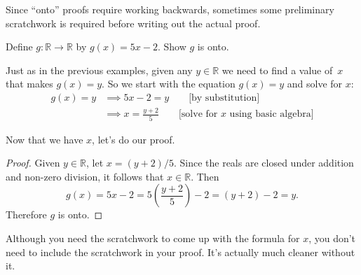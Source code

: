% 
%

Since ``onto'' proofs require working backwards, sometimes some preliminary scratchwork is required before writing out the actual proof.

\begin{example}{}
Define $g \colon \mathbb{R} \to \mathbb{R}$ by $g(x) = 5x - 2$. Show $g$ is onto.


\begin{scratchwork}
Just as in the previous examples, given any $y \in \mathbb{R}$  we need to find a value of~$x$ that makes $g(x) = y$. So we start with the equation $g(x) = y$ and solve for $x$:
\begin{align*}
g(x) = y  &\implies 5x-2 = y \qquad \text{[by substitution]}\\
 & \implies x = \frac{y+2}{5}\qquad \text{[solve for $x$ using basic algebra]}
\end{align*}

\noindent
Now that we have $x$, let's do our proof.
\end{scratchwork}

\begin{proof} 
Given $y \in \mathbb{R}$, let $x = (y+2)/5$.  Since the reals are closed under addition and non-zero division, it follows that $x \in \mathbb{R}$. Then
\[ g(x) = 5x - 2 = 5 \left( \frac{y+2}{5} \right) - 2 = (y+2) - 2 = y . \]
Therefore $g$ is onto.
\end{proof}

\medskip
Although you need the scratchwork to come up with the formula for $x$, you don't need to include the scratchwork in your proof. It's actually much cleaner without it.
\end{example}


